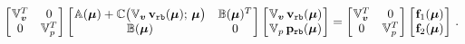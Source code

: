 \documentclass[12pt, a4paper, twoside, openright, notitlepage]{report}
\numberwithin{equation}{chapter}
\theoremstyle{theorem}
\theoremstyle{definition}
\theoremstyle{remark}
\theoremstyle{proposition}
\numberwithin{figure}{chapter}
\newcommand{\bg}[1]{\boldsymbol{#1}}
\begin{document}
		\begin{equation}
			\label{eq:ns-reduced-system}
			\begin{bmatrix}
			\hspace*{-0.15cm}
			\begin{array}{cc}
				\mathbb{V}_{\bg{v}}^T & 0 \\
				0 & \mathbb{V}_p^T
			\end{array} 
			\hspace*{-0.15cm}
			\end{bmatrix} 
			\begin{bmatrix}
			\hspace*{-0.15cm}
			\begin{array}{cc}
				\mathbb{A}(\bg{\mu}) + \mathbb{C} \big( \mathbb{V}_{\bg{v}} \, \mathbf{v}_{\texttt{rb}}(\bg{\mu}); \, \bg{\mu} \big) & \mathbb{B}(\bg{\mu})^T \\
				\mathbb{B}(\bg{\mu}) & 0
			\end{array} 
			\hspace*{-0.15cm}
			\end{bmatrix} 
			\begin{bmatrix}
			\hspace*{-0.15cm}
			\begin{array}{c}
				\mathbb{V}_{\bg{v}} \, \mathbf{v}_{\texttt{rb}}(\bg{\mu}) \\
				\mathbb{V}_{p} \, \mathbf{p}_{\texttt{rb}}(\bg{\mu})
			\end{array} 
			\hspace*{-0.15cm}
			\end{bmatrix} 
			=
			\begin{bmatrix}
			\hspace*{-0.15cm}
			\begin{array}{cc}
				\mathbb{V}_{\bg{v}}^T & 0 \\
				0 & \mathbb{V}_p^T
			\end{array} 
			\hspace*{-0.15cm}
			\end{bmatrix} 
			\begin{bmatrix}
			\hspace*{-0.15cm}
			\begin{array}{c}
				\mathbf{f}_1(\bg{\mu}) \\
				\mathbf{f}_2(\bg{\mu})
			\end{array} 
			\hspace*{-0.15cm}
			\end{bmatrix} \, .
		\end{equation}
\end{document}
